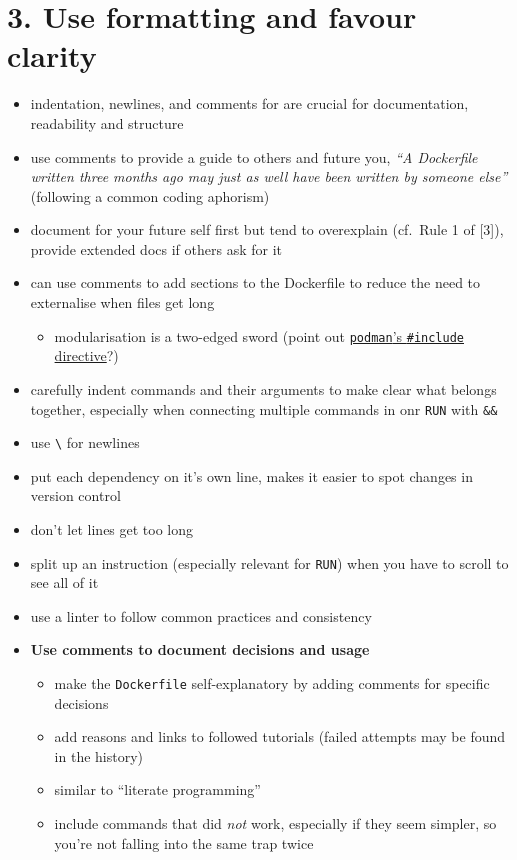 \documentclass[10pt,letterpaper]{article}
\providecommand{\tightlist}{%
  \setlength{\itemsep}{0pt}\setlength{\parskip}{0pt}}
\begin{document}
\hypertarget{use-formatting-and-favour-clarity}{%
\section{3. Use formatting and favour
clarity}\label{use-formatting-and-favour-clarity}}

\begin{itemize}
\tightlist
\item
  indentation, newlines, and comments for are crucial for documentation,
  readability and structure
\item
  use comments to provide a guide to others and future you, \emph{``A
  Dockerfile written three months ago may just as well have been written
  by someone else''} (following a common coding aphorism)
\item
  document for your future self first but tend to overexplain (cf.~Rule
  1 of {[}3{]}), provide extended docs if others ask for it
\item
  can use comments to add sections to the Dockerfile to reduce the need
  to externalise when files get long

  \begin{itemize}
  \tightlist
  \item
    modularisation is a two-edged sword (point out
    \href{https://www.mankier.com/1/podman-build}{\texttt{podman}'s
    \texttt{\#include} directive}?)
  \end{itemize}
\item
  carefully indent commands and their arguments to make clear what
  belongs together, especially when connecting multiple commands in onr
  \texttt{RUN} with \texttt{\&\&}
\item
  use \texttt{\textbackslash{}} for newlines
\item
  put each dependency on it's own line, makes it easier to spot changes
  in version control
\item
  don't let lines get too long
\item
  split up an instruction (especially relevant for \texttt{RUN}) when
  you have to scroll to see all of it
\item
  use a linter to follow common practices and consistency
\item
  \textbf{Use comments to document decisions and usage}

  \begin{itemize}
  \tightlist
  \item
    make the \texttt{Dockerfile} self-explanatory by adding comments for
    specific decisions
  \item
    add reasons and links to followed tutorials (failed attempts may be
    found in the history)
  \item
    similar to ``literate programming''
  \item
    include commands that did \emph{not} work, especially if they seem
    simpler, so you're not falling into the same trap twice
  \end{itemize}
\end{itemize}
\end{document}
